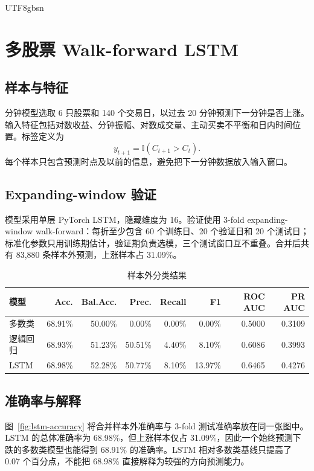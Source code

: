 \documentclass[a4paper,11pt,openany]{report}
\begin{document}
\begin{CJK*}{UTF8}{gbsn}
\chapter{多股票 Walk-forward LSTM}

\section{样本与特征}

分钟模型选取 6 只股票和 140 个交易日，以过去 20 分钟预测下一分钟是否上涨。输入特征包括对数收益、分钟振幅、对数成交量、主动买卖不平衡和日内时间位置。标签定义为
\begin{equation}
y_{t+1}=\mathbb{I}(C_{t+1}>C_t).
\end{equation}
每个样本只包含预测时点及以前的信息，避免把下一分钟数据放入输入窗口。

\section{Expanding-window 验证}

模型采用单层 PyTorch LSTM，隐藏维度为 16。验证使用 3-fold expanding-window walk-forward：每折至少包含 60 个训练日、20 个验证日和 20 个测试日；标准化参数只用训练期估计，验证期负责选模，三个测试窗口互不重叠。合并后共有 83,880 条样本外预测，上涨样本占 31.09\%。

\begin{table}[H]
\centering
\small
\caption{样本外分类结果}
\begin{tabular}{lrrrrrrr}
\toprule
模型 & Acc. & Bal.Acc. & Prec. & Recall & F1 & ROC AUC & PR AUC \\
\midrule
多数类 & 68.91\% & 50.00\% & 0.00\% & 0.00\% & 0.00\% & 0.5000 & 0.3109 \\
逻辑回归 & 68.93\% & 51.23\% & 50.51\% & 4.40\% & 8.10\% & 0.6086 & 0.3993 \\
LSTM & 68.98\% & 52.28\% & 50.77\% & 8.10\% & 13.97\% & 0.6465 & 0.4276 \\
\bottomrule
\end{tabular}
\end{table}

\section{准确率与解释}

图~\ref{fig:lstm-accuracy} 将合并样本外准确率与 3-fold 测试准确率放在同一张图中。LSTM 的总体准确率为 68.98\%，但上涨样本仅占 31.09\%，因此一个始终预测下跌的多数类模型也能得到 68.91\% 的准确率。LSTM 相对多数类基线只提高了 0.07 个百分点，不能把 68.98\% 直接解释为较强的方向预测能力。


\end{CJK*}
\end{document}
